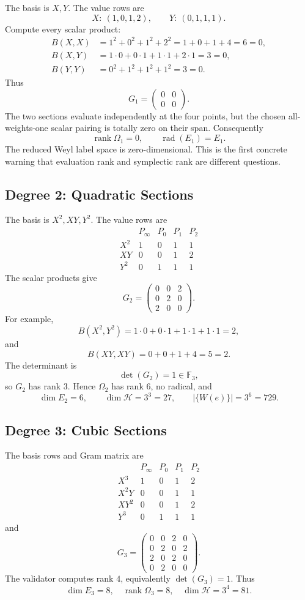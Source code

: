 The basis is \(X,Y\).  The value rows are
\[
  X:\ (1,0,1,2),\qquad
  Y:\ (0,1,1,1).
\]
Compute every scalar product:
\[
\begin{aligned}
B(X,X)&=1^2+0^2+1^2+2^2=1+0+1+4=6=0,\\
B(X,Y)&=1\cdot0+0\cdot1+1\cdot1+2\cdot1=3=0,\\
B(Y,Y)&=0^2+1^2+1^2+1^2=3=0.
\end{aligned}
\]
Thus
\[
  G_1=
  \begin{pmatrix}
  0&0\\
  0&0
  \end{pmatrix}.
\]
The two sections evaluate independently at the four points, but the chosen
all-weights-one scalar pairing is totally zero on their span.  Consequently
\[
  \operatorname{rank}\Omega_1=0,\qquad
  \operatorname{rad}(E_1)=E_1.
\]
The reduced Weyl label space is zero-dimensional.  This is the first concrete
warning that evaluation rank and symplectic rank are different questions.

\subsection{Degree 2: Quadratic Sections}

The basis is \(X^2,XY,Y^2\).  The value rows are
\[
\begin{array}{c|cccc}
&P_\infty&P_0&P_1&P_2\\
\hline
X^2&1&0&1&1\\
XY&0&0&1&2\\
Y^2&0&1&1&1
\end{array}
\]
The scalar products give
\[
  G_2=
  \begin{pmatrix}
  0&0&2\\
  0&2&0\\
  2&0&0
  \end{pmatrix}.
\]
For example,
\[
  B(X^2,Y^2)=1\cdot0+0\cdot1+1\cdot1+1\cdot1=2,
\]
and
\[
  B(XY,XY)=0+0+1+4=5=2.
\]
The determinant is
\[
  \det(G_2)=1\in\mathbb F_3,
\]
so \(G_2\) has rank \(3\).  Hence \(\Omega_2\) has rank \(6\), no radical,
and
\[
  \dim E_2=6,\qquad
  \dim\mathcal H=3^3=27,\qquad
  |\{W(e)\}|=3^6=729.
\]

\subsection{Degree 3: Cubic Sections}

The basis rows and Gram matrix are
\[
\begin{array}{c|cccc}
&P_\infty&P_0&P_1&P_2\\
\hline
X^3&1&0&1&2\\
X^2Y&0&0&1&1\\
XY^2&0&0&1&2\\
Y^3&0&1&1&1
\end{array}
\]
and
\[
  G_3=
  \begin{pmatrix}
  0&0&2&0\\
  0&2&0&2\\
  2&0&2&0\\
  0&2&0&0
  \end{pmatrix}.
\]
The validator computes rank \(4\), equivalently \(\det(G_3)=1\).  Thus
\[
  \dim E_3=8,\quad \operatorname{rank}\Omega_3=8,\quad
  \dim\mathcal H=3^4=81.
\]

